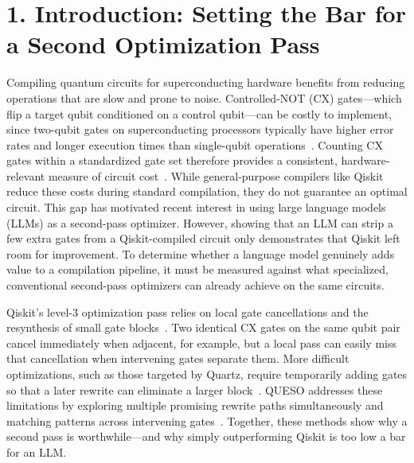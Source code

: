 \documentclass[12pt]{article}
\begin{document}

\section{1. Introduction: Setting the Bar for a Second Optimization Pass}

Compiling quantum circuits for superconducting hardware benefits from reducing operations that are slow
and prone to noise. Controlled-NOT (CX) gates—which flip a target qubit conditioned on a control
qubit—can be costly to implement, since two-qubit gates on superconducting processors typically have
higher error rates and longer execution times than single-qubit operations~\cite{quiroz-hardware}.
Counting CX gates within a standardized gate set therefore provides a
consistent, hardware-relevant measure of circuit cost~\cite{tket}. While general-purpose compilers like
Qiskit reduce these costs during standard compilation, they do not guarantee an optimal circuit. This
gap has motivated recent interest in using large language models (LLMs) as a second-pass optimizer.
However, showing that an LLM can strip a few extra gates from a Qiskit-compiled circuit only
demonstrates that Qiskit left room for improvement. To determine whether a language model genuinely adds
value to a compilation pipeline, it must be measured against what specialized, conventional second-pass
optimizers can already achieve on the same circuits.

Qiskit’s level-3 optimization pass relies on local gate cancellations and the resynthesis of small gate
blocks~\cite{qiskit-code}. Two identical CX gates on the same qubit pair cancel immediately when
adjacent, for example, but a local pass can easily miss that cancellation when intervening gates
separate them. More difficult optimizations, such as those targeted by Quartz, require temporarily
adding gates so that a later rewrite can eliminate a larger block~\cite{quartz}. QUESO addresses these
limitations by exploring multiple promising rewrite paths simultaneously and matching patterns across
intervening gates~\cite{queso}. Together, these methods show why a second pass is worthwhile—and why
simply outperforming Qiskit is too low a bar for an LLM.
\end{document}
